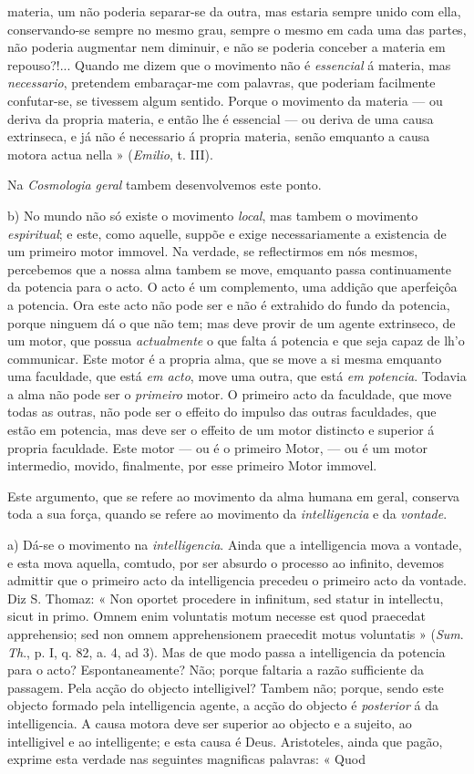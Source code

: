 materia, um não poderia separar-se da outra, mas estaria sempre unido com ella, conservando-se sempre no mesmo grau, sempre o mesmo em cada uma das partes, não poderia augmentar nem diminuir, e não se poderia conceber a materia em repouso?!... Quando me dizem que o movimento não é \emph{essencial} á materia, mas \emph{necessario}, pretendem embaraçar-me com palavras, que poderiam facilmente confutar-se, se tivessem algum sentido. Porque o movimento da materia --- ou deriva da propria materia, e então lhe é essencial --- ou deriva de uma causa extrinseca, e já não é necessario á propria materia, senão emquanto a causa motora actua nella » (\emph{Emilio}, t. III).\par Na \emph{Cosmologia geral} tambem desenvolvemos este ponto.\par b) No mundo não só existe o movimento \emph{local}, mas tambem o movimento \emph{espiritual}; e este, como aquelle, suppõe e exige necessariamente a existencia de um primeiro motor immovel. Na verdade, se reflectirmos em nós mesmos, percebemos que a nossa alma tambem se move, emquanto passa continuamente da potencia para o acto. O acto é um complemento, uma addição que aperfeiçôa a potencia. Ora este acto não pode ser e não é extrahido do fundo da potencia, porque ninguem dá o que não tem; mas deve provir de um agente extrinseco, de um motor, que possua \emph{actualmente} o que falta á potencia e que seja capaz de lh'o communicar. Este motor é a propria alma, que se move a si mesma emquanto uma faculdade, que está \emph{em acto}, move uma outra, que está \emph{em potencia}. Todavia a alma não pode ser o \emph{primeiro} motor. O primeiro acto da faculdade, que move todas as outras, não pode ser o effeito do impulso das outras faculdades, que estão em potencia, mas deve ser o effeito de um motor distincto e superior á propria faculdade. Este motor --- ou é o primeiro Motor, --- ou é um motor intermedio, movido, finalmente, por esse primeiro Motor immovel.\par Este argumento, que se refere ao movimento da alma humana em geral, conserva toda a sua força, quando se refere ao movimento da \emph{intelligencia} e da \emph{vontade}.\par a) Dá-se o movimento na \emph{intelligencia}. Ainda que a intelligencia mova a vontade, e esta mova aquella, comtudo, por ser absurdo o processo ao infinito, devemos admittir que o primeiro acto da intelligencia precedeu o primeiro acto da vontade. Diz S. Thomaz: « Non oportet procedere in infinitum, sed statur in intellectu, sicut in primo. Omnem enim voluntatis motum necesse est quod praecedat apprehensio; sed non omnem apprehensionem praecedit motus voluntatis » (\emph{Sum}. \emph{Th}., p. I, q. 82, a. 4, ad 3). Mas de que modo passa a intelligencia da potencia para o acto? Espontaneamente? Não; porque faltaria a razão sufficiente da passagem. Pela acção do objecto intelligivel? Tambem não; porque, sendo este objecto formado pela intelligencia agente, a acção do objecto é \emph{posterior} á da intelligencia. A causa motora deve ser superior ao objecto e a sujeito, ao intelligivel e ao intelligente; e esta causa é Deus. Aristoteles, ainda que pagão, exprime esta verdade nas seguintes magnificas palavras: « Quod 